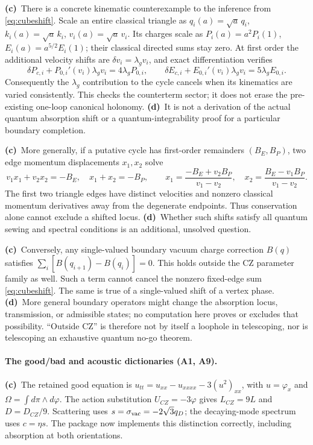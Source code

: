 \documentclass[11pt,a4paper]{article}
\newcommand{\Lc}{\textbf{(c)}\ }
\newcommand{\Ld}{\textbf{(d)}\ }
\begin{document}
\Lc There is a concrete kinematic counterexample to the inference from
\eqref{eq:cubeshift}. Scale an entire classical triangle as
$q_i(a)=\sqrt a\,q_i$, $k_i(a)=\sqrt a\,k_i$,
$v_i(a)=\sqrt a\,v_i$. Its charges scale as
$P_i(a)=a^2P_i(1)$, $E_i(a)=a^{5/2}E_i(1)$; their classical directed
sums stay zero. At first order the additional velocity shifts are
$\delta v_i=\lambda_gv_i$, and exact differentiation verifies
\begin{equation}
 \delta P_{c,i}+P_{0,i}'(v_i)\lambda_gv_i=4\lambda_gP_{0,i},\qquad
 \delta E_{c,i}+E_{0,i}'(v_i)\lambda_gv_i=5\lambda_gE_{0,i}.
 \label{eq:scaledclosure}
\end{equation}
Consequently the $\lambda_g$ contribution to the cycle cancels when its
kinematics are varied consistently. This checks the counterterm sector;
it does not erase the pre-existing one-loop canonical holonomy.
\Ld It is not a derivation of the actual quantum absorption shift or a
quantum-integrability proof for a particular boundary completion.

\Lc More generally, if a putative cycle has first-order remainders
$(B_E,B_P)$, two edge momentum displacements $x_1,x_2$ solve
\begin{equation}
 v_1x_1+v_2x_2=-B_E,\quad x_1+x_2=-B_P,
 \qquad
 x_1=\frac{-B_E+v_2B_P}{v_1-v_2},\quad
 x_2=\frac{B_E-v_1B_P}{v_1-v_2}.
\end{equation}
The first two triangle edges have distinct velocities and nonzero
classical momentum derivatives away from the degenerate endpoints.
Thus conservation alone cannot exclude a shifted locus.
\Ld Whether such shifts satisfy all quantum sewing and spectral conditions
is an additional, unsolved question.

\Lc Conversely, any single-valued boundary vacuum charge correction
$B(q)$ satisfies $\sum_i[B(q_{i+1})-B(q_i)]=0$. This holds outside the
CZ parameter family as well. Such a term cannot cancel the nonzero
fixed-edge sum \eqref{eq:cubeshift}. The same is true of a single-valued
shift of a vertex phase. \Ld More general boundary operators might change
the absorption locus, transmission, or admissible states; no computation
here proves or excludes that possibility. ``Outside CZ'' is therefore not
by itself a loophole in telescoping, nor is telescoping an exhaustive
quantum no-go theorem.

\paragraph{The good/bad and acoustic dictionaries (A1, A9).}
\Lc The retained good equation is
$u_{tt}=u_{xx}-u_{xxxx}-3(u^2)_{xx}$, with
$u=\varphi_x$ and $\Omega=\int d\pi\wedge d\varphi$.
The action substitution $U_{CZ}=-3\varphi$ gives $L_{CZ}=9L$ and
$D=D_{CZ}/9$. Scattering uses $s=\sigma_{\rm vac}=-2\sqrt3q_D$;
the decaying-mode spectrum uses $c=\eta s$. The package now implements
this distinction correctly, including absorption at both orientations.
\end{document}
